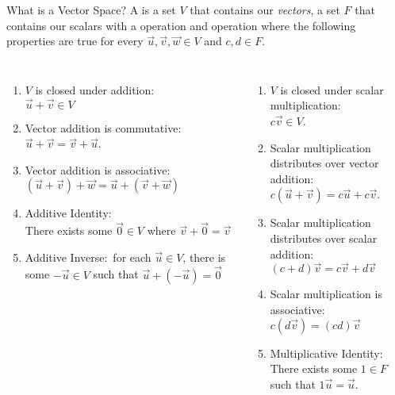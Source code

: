 \documentclass[xcoler=dvipsnames, aspectratio=169]{beamer}
\date{Vector Spaces}
\begin{document}
    \begin{frame}{What is a Vector Space?}
        \footnotesize
        A  is a set $V$ that contains our \textit{vectors}, a set
        $F$ that contains our scalars with a  operation and 
         operation where the following properties are
        true for every $\vec{u},\vec{v},\vec{w}\in V$ and $c,d\in F$.
        \begin{columns}
            \begin{enumerate}
                \pause\item $V$ is closed under addition:\pause\\
                    $\vec{u} + \vec{v}\in V$
                \pause\item Vector addition is commutative:\pause\\
                    $\vec{u}+\vec{v} = \vec{v}+\vec{u}$.
                \pause\item Vector addition is associative:\pause\\
                    $(\vec{u} + \vec{v}) + \vec{w} = \vec{u} + (\vec{v} + \vec{w})$
                \pause\item Additive Identity:\pause\\
                    There exists some $\vec{0}\in V$ where $\vec{v} + \vec{0} = \vec{v}$
                \pause\item Additive Inverse:\pause\ 
                    for each $\vec{u}\in V$, there is some $-\vec{u}\in V$ such that
                    $\vec{u} + (-\vec{u}) = \vec{0}$
            \end{enumerate}
            \begin{enumerate}\addtocounter{enumi}{5}
                \pause\item $V$ is closed under scalar multiplication:\pause\\
                    $c\vec{v}\in V$.
                \pause\item Scalar multiplication distributes over vector addition:\pause\\
                    $c(\vec{u} + \vec{v}) = c\vec{u} + c\vec{v}$.
                \pause\item Scalar multiplication distributes over scalar addition:\pause\\
                    $(c+d)\vec{v} = c\vec{v} + d\vec{v}$
                \pause\item Scalar multiplication is associative:\pause\\
                    $c(d\vec{v}) = (cd)\vec{v}$
                \pause\item Multiplicative Identity:\pause\\
                    There exists some $1\in F$ such that $1\vec{u} = \vec{u}$.
            \end{enumerate}
        \end{columns}
    \end{frame}
\end{document}

